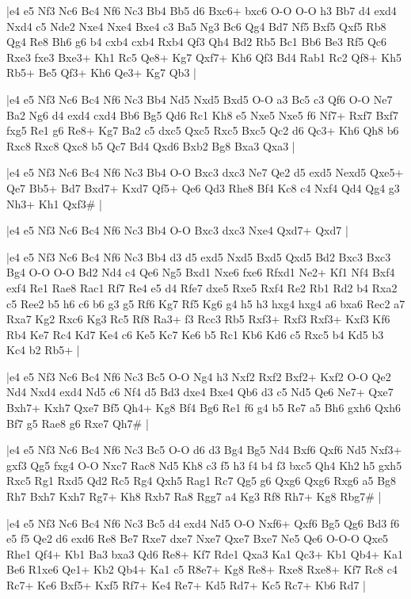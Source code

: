 \whitename{}
\blackname{}
\makegametitle
|e4 e5 Nf3 Nc6 Bc4 Nf6 Nc3 Bb4 Bb5 d6 Bxc6+ bxc6 O-O O-O h3 Bb7 d4 exd4 Nxd4 c5 Nde2 Nxe4 Nxe4 Bxe4 c3 Ba5 Ng3 Bc6 Qg4 Bd7 Nf5 Bxf5 Qxf5 Rb8 Qg4 Re8 Bh6 g6 b4 cxb4 cxb4 Rxb4 Qf3 Qh4 Bd2 Rb5 Bc1 Bb6 Be3 Rf5 Qc6 Rxe3 fxe3 Bxe3+ Kh1 Rc5 Qe8+ Kg7 Qxf7+ Kh6 Qf3 Bd4 Rab1 Rc2 Qf8+ Kh5 Rb5+ Be5 Qf3+ Kh6 Qe3+ Kg7 Qb3  |

\whitename{}
\blackname{}
\makegametitle
|e4 e5 Nf3 Nc6 Bc4 Nf6 Nc3 Bb4 Nd5 Nxd5 Bxd5 O-O a3 Bc5 c3 Qf6 O-O Ne7 Ba2 Ng6 d4 exd4 cxd4 Bb6 Bg5 Qd6 Rc1 Kh8 e5 Nxe5 Nxe5 f6 Nf7+ Rxf7 Bxf7 fxg5 Re1 g6 Re8+ Kg7 Ba2 c5 dxc5 Qxc5 Rxc5 Bxc5 Qc2 d6 Qc3+ Kh6 Qh8 b6 Rxc8 Rxc8 Qxc8 b5 Qc7 Bd4 Qxd6 Bxb2 Bg8 Bxa3 Qxa3  |

\whitename{}
\blackname{}
\makegametitle
|e4 e5 Nf3 Nc6 Bc4 Nf6 Nc3 Bb4 O-O Bxc3 dxc3 Ne7 Qe2 d5 exd5 Nexd5 Qxe5+ Qe7 Bb5+ Bd7 Bxd7+ Kxd7 Qf5+ Qe6 Qd3 Rhe8 Bf4 Kc8 c4 Nxf4 Qd4 Qg4 g3 Nh3+ Kh1 Qxf3\#  |

\whitename{}
\blackname{}
\makegametitle
|e4 e5 Nf3 Nc6 Bc4 Nf6 Nc3 Bb4 O-O Bxc3 dxc3 Nxe4 Qxd7+ Qxd7  |

\whitename{}
\blackname{}
\makegametitle
|e4 e5 Nf3 Nc6 Bc4 Nf6 Nc3 Bb4 d3 d5 exd5 Nxd5 Bxd5 Qxd5 Bd2 Bxc3 Bxc3 Bg4 O-O O-O Bd2 Nd4 c4 Qe6 Ng5 Bxd1 Nxe6 fxe6 Rfxd1 Ne2+ Kf1 Nf4 Bxf4 exf4 Re1 Rae8 Rac1 Rf7 Re4 e5 d4 Rfe7 dxe5 Rxe5 Rxf4 Re2 Rb1 Rd2 b4 Rxa2 c5 Ree2 b5 h6 c6 b6 g3 g5 Rf6 Kg7 Rf5 Kg6 g4 h5 h3 hxg4 hxg4 a6 bxa6 Rec2 a7 Rxa7 Kg2 Rxc6 Kg3 Rc5 Rf8 Ra3+ f3 Rcc3 Rb5 Rxf3+ Rxf3 Rxf3+ Kxf3 Kf6 Rb4 Ke7 Rc4 Kd7 Ke4 c6 Ke5 Kc7 Ke6 b5 Rc1 Kb6 Kd6 c5 Rxc5 b4 Kd5 b3 Kc4 b2 Rb5+  |

\whitename{}
\blackname{}
\makegametitle
|e4 e5 Nf3 Nc6 Bc4 Nf6 Nc3 Bc5 O-O Ng4 h3 Nxf2 Rxf2 Bxf2+ Kxf2 O-O Qe2 Nd4 Nxd4 exd4 Nd5 c6 Nf4 d5 Bd3 dxe4 Bxe4 Qb6 d3 c5 Nd5 Qe6 Ne7+ Qxe7 Bxh7+ Kxh7 Qxe7 Bf5 Qh4+ Kg8 Bf4 Bg6 Re1 f6 g4 b5 Re7 a5 Bh6 gxh6 Qxh6 Bf7 g5 Rae8 g6 Rxe7 Qh7\#  |

\whitename{}
\blackname{}
\makegametitle
|e4 e5 Nf3 Nc6 Bc4 Nf6 Nc3 Bc5 O-O d6 d3 Bg4 Bg5 Nd4 Bxf6 Qxf6 Nd5 Nxf3+ gxf3 Qg5 fxg4 O-O Nxc7 Rac8 Nd5 Kh8 c3 f5 h3 f4 b4 f3 bxc5 Qh4 Kh2 h5 gxh5 Rxc5 Rg1 Rxd5 Qd2 Rc5 Rg4 Qxh5 Rag1 Rc7 Qg5 g6 Qxg6 Qxg6 Rxg6 a5 Bg8 Rh7 Bxh7 Kxh7 Rg7+ Kh8 Rxb7 Ra8 Rgg7 a4 Kg3 Rf8 Rh7+ Kg8 Rbg7\#  |

\whitename{}
\blackname{}
\makegametitle
|e4 e5 Nf3 Nc6 Bc4 Nf6 Nc3 Bc5 d4 exd4 Nd5 O-O Nxf6+ Qxf6 Bg5 Qg6 Bd3 f6 e5 f5 Qe2 d6 exd6 Re8 Be7 Rxe7 dxe7 Nxe7 Qxe7 Bxe7 Ne5 Qe6 O-O-O Qxe5 Rhe1 Qf4+ Kb1 Ba3 bxa3 Qd6 Re8+ Kf7 Rde1 Qxa3 Ka1 Qc3+ Kb1 Qb4+ Ka1 Be6 R1xe6 Qe1+ Kb2 Qb4+ Ka1 c5 R8e7+ Kg8 Re8+ Rxe8 Rxe8+ Kf7 Rc8 c4 Rc7+ Ke6 Bxf5+ Kxf5 Rf7+ Ke4 Re7+ Kd5 Rd7+ Kc5 Rc7+ Kb6 Rd7  |

